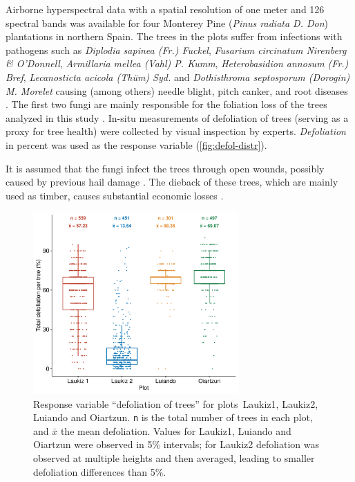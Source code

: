\documentclass[remotesensing,article,submit,moreauthors,pdftex]{Definitions/mdpi}
\begin{document}
Airborne hyperspectral data with a spatial resolution of one meter and 126 spectral bands was available for four Monterey Pine (\textit{Pinus radiata D. Don}) plantations in northern Spain.
The trees in the plots suffer from infections with pathogens such as \textit{Diplodia sapinea (Fr.) Fuckel}, \textit{Fusarium circinatum Nirenberg \& O'Donnell}, \textit{Armillaria mellea (Vahl) P. Kumm}, \textit{Heterobasidion annosum (Fr.) Bref}, \textit{Lecanosticta acicola (Thüm) Syd.} and \textit{Dothisthroma septosporum (Dorogin) M. Morelet} causing (among others) needle blight, pitch canker, and root diseases \cite{mesanza2016, iturritxa2017}.
The first two fungi are mainly responsible for the foliation loss of the trees analyzed in this study \cite{iturritxa2014}.
In-situ measurements of defoliation of trees (serving as a proxy for tree health) were collected by visual inspection by experts. \textit{Defoliation} in percent was used as the response variable (\autoref{fig:defol-distr}).

It is assumed that the fungi infect the trees through open wounds, possibly caused by previous hail damage \cite{iturritxa2014}.
The dieback of these trees, which are mainly used as timber, causes substantial economic losses \cite{ganley2009}.

\begin{figure} [t!]
	\centering
	\begin{center}
		\includegraphics[width=0.7\textwidth] {defoliation-distribution-plot-1.pdf}
		\caption{Response variable ``defoliation of trees'' for plots~Laukiz1, Laukiz2, Luiando and Oiartzun. \texttt{n} is the total number of trees in each plot, and $\bar{x}$ the mean defoliation. Values for Laukiz1, Luiando and Oiartzun were observed in 5\% intervals; for Laukiz2 defoliation was observed at multiple heights and then averaged, leading to smaller defoliation differences than 5\%.}\label{fig:defol-distr}
	\end{center}
\end{figure}
\end{document}
